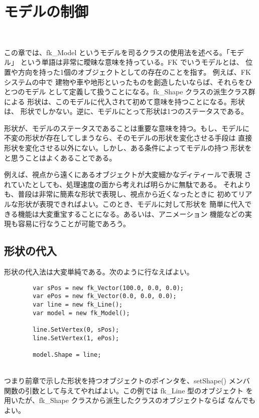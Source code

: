 \chapter{モデルの制御} \label{chap:model} ~

この章では、fk\_Model というモデルを司るクラスの使用法を述べる。「モデル」
という単語は非常に曖昧な意味を持っている。FK でいうモデルとは、
位置や方向を持った1個のオブジェクトとしての存在のことを指す。
例えば、FK システムの中で
建物や車や地形といったものを創造したいならば、それらをひとつのモデル
として定義して扱うことになる。fk\_Shape クラスの派生クラス群による
形状は、このモデルに代入されて初めて意味を持つことになる。形状は、
形状でしかない。逆に、モデルにとって形状は1つのステータスである。

形状が、モデルのステータスであることは重要な意味を持つ。もし、モデルに
不変の形状が存在してしまうなら、そのモデルの形状を変化させる手段は
直接形状を変化させる以外にない。しかし、ある条件によってモデルの持つ
形状をと思うことはよくあることである。

例えば、視点から遠くにあるオブジェクトが大変細かなディティールで表現
されていたとしても、処理速度の面から考えれば明らかに無駄である。
それよりも、普段は非常に簡素な形状で表現し、視点から近くなったときに
初めてリアルな形状が表現できればよい。このとき、モデルに対して形状を
簡単に代入できる機能は大変重宝することになる。あるいは、アニメーション
機能などの実現も容易に行なうことが可能であろう。
\section{形状の代入}
形状の代入法は大変単純である。次のように行なえばよい。
\\
\begin{breakbox}
\begin{verbatim}
        var sPos = new fk_Vector(100.0, 0.0, 0.0);
        var ePos = new fk_Vector(0.0, 0.0, 0.0);
        var line = new fk_Line();
        var model = new fk_Model();

        line.SetVertex(0, sPos);
        line.SetVertex(1, ePos);

        model.Shape = line;
\end{verbatim}
\end{breakbox}
~ \\
つまり前章で示した形状を持つオブジェクトのポインタを、setShape() メンバ
関数の引数として与えてやればよい。この例では fk\_Line 型のオブジェクト
を用いたが、fk\_Shape クラスから派生したクラスのオブジェクトならば
なんでもよい。

